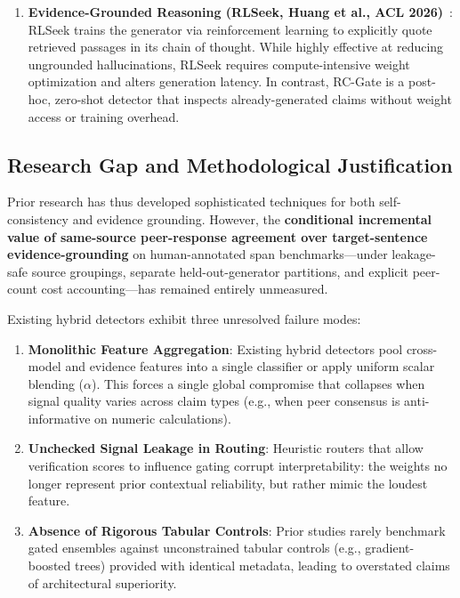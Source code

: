 \documentclass[pdflatex,sn-mathphys,Numbered]{sn-jnl}
\begin{document}
\begin{enumerate}
    \item \textbf{Evidence-Grounded Reasoning (RLSeek, Huang et al., ACL 2026)}~\cite{huang2026rlseek}: RLSeek trains the generator via reinforcement learning to explicitly quote retrieved passages in its chain of thought. While highly effective at reducing ungrounded hallucinations, RLSeek requires compute-intensive weight optimization and alters generation latency. In contrast, RC-Gate is a post-hoc, zero-shot detector that inspects already-generated claims without weight access or training overhead.
\end{enumerate}

\subsection{Research Gap and Methodological Justification}\label{subsec:gap_justification}

Prior research has thus developed sophisticated techniques for both self-consistency and evidence grounding. However, the \textbf{conditional incremental value of same-source peer-response agreement over target-sentence evidence-grounding} on human-annotated span benchmarks—under leakage-safe source groupings, separate held-out-generator partitions, and explicit peer-count cost accounting—has remained entirely unmeasured.

Existing hybrid detectors exhibit three unresolved failure modes:
\begin{enumerate}
    \item \textbf{Monolithic Feature Aggregation}: Existing hybrid detectors pool cross-model and evidence features into a single classifier or apply uniform scalar blending ($\alpha$). This forces a single global compromise that collapses when signal quality varies across claim types (e.g., when peer consensus is anti-informative on numeric calculations).
    \item \textbf{Unchecked Signal Leakage in Routing}: Heuristic routers that allow verification scores to influence gating corrupt interpretability: the weights no longer represent prior contextual reliability, but rather mimic the loudest feature.
    \item \textbf{Absence of Rigorous Tabular Controls}: Prior studies rarely benchmark gated ensembles against unconstrained tabular controls (e.g., gradient-boosted trees) provided with identical metadata, leading to overstated claims of architectural superiority.
\end{enumerate}
\end{document}
